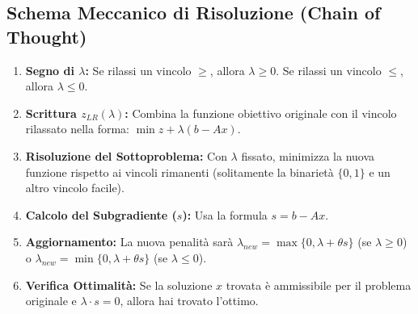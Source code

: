 \documentclass[11pt, a4paper]{article}
\begin{document}
\subsection{Schema Meccanico di Risoluzione (Chain of Thought)}
\begin{enumerate}
    \item \textbf{Segno di $\lambda$:} Se rilassi un vincolo $\ge$, allora $\lambda \ge 0$. Se rilassi un vincolo $\le$, allora $\lambda \le 0$.
    \item \textbf{Scrittura $z_{LR}(\lambda)$:} Combina la funzione obiettivo originale con il vincolo rilassato nella forma: $\min z + \lambda(b - Ax)$.
    \item \textbf{Risoluzione del Sottoproblema:} Con $\lambda$ fissato, minimizza la nuova funzione rispetto ai vincoli rimanenti (solitamente la binarietà $\{0,1\}$ e un altro vincolo facile).
    \item \textbf{Calcolo del Subgradiente ($s$):} Usa la formula $s = b - Ax$.
    \item \textbf{Aggiornamento:} La nuova penalità sarà $\lambda_{new} = \max\{0, \lambda + \theta s\}$ (se $\lambda \ge 0$) o $\lambda_{new} = \min\{0, \lambda + \theta s\}$ (se $\lambda \le 0$).
    \item \textbf{Verifica Ottimalità:} Se la soluzione $x$ trovata è ammissibile per il problema originale e $\lambda \cdot s = 0$, allora hai trovato l'ottimo.
\end{enumerate}
\end{document}
